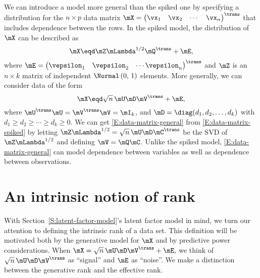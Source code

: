 We can introduce a model more general than the spiked one by specifying
a distribution for the $n\times p$ data matrix 
\(
    \mX
    =
    \left(
    \begin{matrix}
        \vx_1 &
        \vx_2 &
        \cdots &
        \vx_n
    \end{matrix}
    \right)^\trans
\)
that includes dependence between the rows.  In the spiked model, the
distribution of $\mX$ can be described as
\begin{equation}\label{E:data-matrix-spiked}
    \mX
        \eqd
        \mZ
        \mLambda^{1/2}
        \mQ^\trans
        +
        \mE,
\end{equation}
where 
\(
    \mE 
        = 
        \left(
        \begin{matrix}
            \vepsilon_1 & \vepsilon_2 & \cdots \vepsilon_n
        \end{matrix}
        \right)^\trans
\)
and $\mZ$ is an $n \times k$ matrix of independent 
$\Normal \left( 0, \, 1 \right)$ elements.  More generally, we can consider
data of the form
\begin{equation}\label{E:data-matrix-general}
    \mX
        \eqd
            \sqrt{n} \,
            \mU
            \mD
            \mV^\trans
            +
            \mE,
\end{equation}
where $\mU^\trans \mU = \mV^\trans \mV = \mI_k$, and $\mD = \diag( d_1, d_2,
\ldots, d_k )$ with $d_1 \geq d_2 \geq \cdots \geq d_k \geq 0$. We can get
\eqref{E:data-matrix-general} from \eqref{E:data-matrix-spiked} by letting
$\mZ \mLambda^{1/2} = \sqrt{n} \, \mU \mD \mC^\trans$ be the SVD of $\mZ
\mLambda^{1/2}$ and defining $\mV = \mQ \mC$. Unlike the spiked model,
\eqref{E:data-matrix-general} can model dependence between variables as well
as dependence between observations.

\section{An intrinsic notion of rank}\label{S:intrinsic-rank}

With Section~\ref{S:latent-factor-model}'s latent factor model in mind, we
turn our attention to defining the intrinsic rank of a data set. This
definition will be motivated both by the generative model for $\mX$ and by
predictive power considerations.  When 
\(
    \mX = \sqrt{n} \, \mU \mD \mV^\trans + \mE,
\)
we think of $\sqrt{n} \, \mU \mD \mV^\trans$ as ``signal'' and $\mE$ as ``noise''.  We make a distinction between the generative rank and the effective rank.

